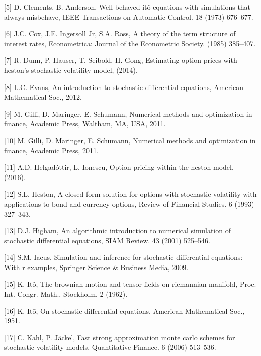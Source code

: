 \documentclass[12pt,twoside]{reedthesis}
\theoremstyle{definition}
\theoremstyle{definition}
\theoremstyle{remark}
\begin{document}
  \hypertarget{ref-clements1973well}{}
  {[}5{]} D. Clements, B. Anderson, Well-behaved itô equations with
  simulations that always misbehave, IEEE Transactions on Automatic
  Control. 18 (1973) 676--677.
  
  \hypertarget{ref-cox1985theory}{}
  {[}6{]} J.C. Cox, J.E. Ingersoll Jr, S.A. Ross, A theory of the term
  structure of interest rates, Econometrica: Journal of the Econometric
  Society. (1985) 385--407.
  
  \hypertarget{ref-dunn2014estimating}{}
  {[}7{]} R. Dunn, P. Hauser, T. Seibold, H. Gong, Estimating option
  prices with heston's stochastic volatility model, (2014).
  
  \hypertarget{ref-evans}{}
  {[}8{]} L.C. Evans, An introduction to stochastic differential
  equations, American Mathematical Soc., 2012.
  
  \hypertarget{ref-nmof}{}
  {[}9{]} M. Gilli, D. Maringer, E. Schumann, Numerical methods and
  optimization in finance, Academic Press, Waltham, MA, USA, 2011.
  
  \hypertarget{ref-gilli_numerical_2011}{}
  {[}10{]} M. Gilli, D. Maringer, E. Schumann, Numerical methods and
  optimization in finance, Academic Press, 2011.
  
  \hypertarget{ref-helgadottir2016option}{}
  {[}11{]} A.D. Helgadóttir, L. Ionescu, Option pricing within the heston
  model, (2016).
  
  \hypertarget{ref-heston1993closed}{}
  {[}12{]} S.L. Heston, A closed-form solution for options with stochastic
  volatility with applications to bond and currency options, Review of
  Financial Studies. 6 (1993) 327--343.
  
  \hypertarget{ref-higham2001}{}
  {[}13{]} D.J. Higham, An algorithmic introduction to numerical
  simulation of stochastic differential equations, SIAM Review. 43 (2001)
  525--546.
  
  \hypertarget{ref-iacus2009simulation}{}
  {[}14{]} S.M. Iacus, Simulation and inference for stochastic
  differential equations: With r examples, Springer Science \& Business
  Media, 2009.
  
  \hypertarget{ref-ito1962}{}
  {[}15{]} K. Itô, The brownian motion and tensor fields on riemannian
  manifold, Proc. Int. Congr. Math., Stockholm. 2 (1962).
  
  \hypertarget{ref-ito1951}{}
  {[}16{]} K. Itō, On stochastic differential equations, American
  Mathematical Soc., 1951.
  
  \hypertarget{ref-kahl2006fast}{}
  {[}17{]} C. Kahl, P. Jäckel, Fast strong approximation monte carlo
  schemes for stochastic volatility models, Quantitative Finance. 6 (2006)
  513--536.
  
\end{document}
